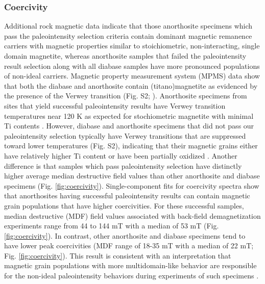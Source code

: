 \subsubsection*{Coercivity}
Additional rock magnetic data indicate that those anorthosite specimens which pass the paleointensity selection criteria contain dominant magnetic remanence carriers with magnetic properties similar to stoichiometric, non-interacting, single domain magnetite, whereas anorthosite samples that failed the paleointensity result selection along with all diabase samples have more pronounced populations of non-ideal carriers. Magnetic property measurement system (MPMS) data show that both the diabase and anorthosite contain (titano)magnetite as evidenced by the presence of the Verwey transition (Fig. S2;  \citealp{Verwey1939a, Feinberg2015a}). Anorthosite specimens from sites that yield successful paleointensity results have Verwey transition temperatures near 120 K as expected for stochiometric magnetite with minimal Ti contents \citep{Ozdemir1993a}. However, diabase and anorthosite specimens that did not pass our paleointensity selection typically have Verwey transitions that are suppressed toward lower temperatures (Fig. S2), indicating that their magnetic grains either have relatively higher Ti content or have been partially oxidized \citep{Ozdemir1993a}. Another difference is that samples which pass paleointensity selection have distinctly higher average median destructive field values than other anorthosite and diabase specimens (Fig. \ref{fig:coercivity}). Single-component fits for coercivity spectra \citep{Maxbauer2016a} show that anorthosites having successful paleointensity results can contain magnetic grain populations that have higher coercivities. For these successful samples, median destructive (MDF) field values associated with back-field demagnetization experiments range from 44 to 144 mT with a median of 53 mT (Fig. \ref{fig:coercivity}). In contrast, other anorthosite and diabase specimens tend to have lower peak coercivities (MDF range of 18-35 mT with a median of 22 mT; Fig. \ref{fig:coercivity}). This result is consistent with an interpretation that magnetic grain populations with more multidomain-like behavior are responsible for the non-ideal paleointensity behaviors during experiments of such specimens \citep{Xu2004a}.

